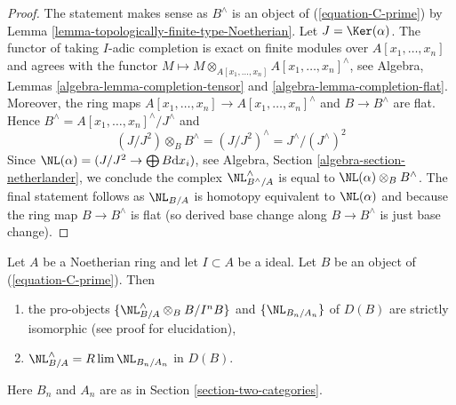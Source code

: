 \begin{proof}
The statement makes sense as $B^\wedge$ is an object of
(\ref{equation-C-prime}) by
Lemma \ref{lemma-topologically-finite-type-Noetherian}.
Let $J = \Ker(\alpha)$. The functor of taking
$I$-adic completion is exact on finite modules over
$A[x_1, \ldots, x_n]$ and agrees with the functor
$M \mapsto M \otimes_{A[x_1, \ldots, x_n]} A[x_1, \ldots, x_n]^\wedge$, see
Algebra, Lemmas \ref{algebra-lemma-completion-tensor} and
\ref{algebra-lemma-completion-flat}. Moreover, the ring maps
$A[x_1, \ldots, x_n] \to A[x_1, \ldots, x_n]^\wedge$
and $B \to B^\wedge$ are flat. Hence
$B^\wedge = A[x_1, \ldots, x_n]^\wedge / J^\wedge$ and
$$
(J/J^2) \otimes_B B^\wedge = (J/J^2)^\wedge = J^\wedge/(J^\wedge)^2
$$
Since $\NL(\alpha) = (J/J^2 \to \bigoplus B\text{d}x_i)$,
see Algebra, Section \ref{algebra-section-netherlander},
we conclude the complex $\NL_{B^\wedge/A}^\wedge$ is equal
to $\NL(\alpha) \otimes_B B^\wedge$. The final statement
follows as $\NL_{B/A}$ is homotopy equivalent to $\NL(\alpha)$
and because the ring map $B \to B^\wedge$ is flat (so derived
base change along $B \to B^\wedge$ is just base change).
\end{proof}

\begin{lemma}
\label{lemma-NL-is-limit}
Let $A$ be a Noetherian ring and let $I \subset A$ be a ideal.
Let $B$ be an object of (\ref{equation-C-prime}). Then
\begin{enumerate}
\item the pro-objects
$\{\NL_{B/A}^\wedge \otimes_B B/I^nB\}$ and $\{\NL_{B_n/A_n}\}$
of $D(B)$ are strictly isomorphic (see proof for elucidation),
\item $\NL_{B/A}^\wedge = R\lim \NL_{B_n/A_n}$ in $D(B)$.
\end{enumerate}
Here $B_n$ and $A_n$ are as in Section \ref{section-two-categories}.
\end{lemma}

